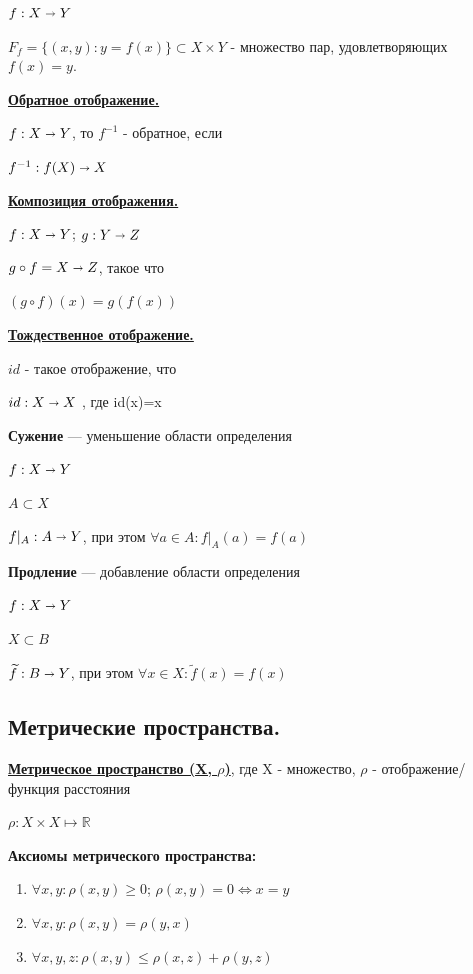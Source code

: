 \documentclass{article}
\newcommand{\deff}[1]{\underline{\textbf{#1}}}
\begin{document}
$f: X\shortrightarrow Y $ 

$F_f = \{(x,y) : y=f(x)\} \subset X \times Y$ - множество пар, удовлетворяющих $f(x)=y$.



\deff{Обратное отображение.}

$f: X \shortrightarrow Y$, то $f^{-1}$ - обратное, если

$f^{-1}: f(X) \shortrightarrow X$

\deff{Композиция отображения.}

$f: X \shortrightarrow Y$; $g: Y \shortrightarrow Z$

$g \circ f = X \shortrightarrow Z$, такое что

$(g \circ f)(x)=g(f(x))$

\deff{Тождественное отображение.}

$id$ - такое отображение, что

$id: X \shortrightarrow X$ , где id(x)=x

\textbf{Сужение} --- уменьшение области определения

$f: X \shortrightarrow Y$

$A \subset X$

$f|_A:A \shortrightarrow Y$, при этом $\forall a \in A:f|_A(a)=f(a)$


\textbf{Продление} --- добавление области определения

$f:X \shortrightarrow Y$

$X \subset B$

$\widetilde{f}: B \shortrightarrow Y$, при этом $\forall x \in X: \widetilde{f}(x)=f(x) $

\pagebreak
\subsection{Метрические пространства.}

\deff{Метрическое пространство (X, $\rho$)}, где  X - множество, $\rho$ - отображение/функция расстояния

$\rho: X \times X \mapsto \mathds{R}$ 

\textbf{Аксиомы метрического пространства:}
\begin{enumerate}
    \item $\forall x,y: \rho(x,y) \geq 0$; $\rho(x,y)=0 \Leftrightarrow x=y$

    \item $\forall x,y: \rho(x,y)=\rho(y,x)$

    \item $\forall x,y,z: \rho(x,y)\leq \rho(x,z) + \rho(y,z)$
\end{enumerate}
\end{document}
